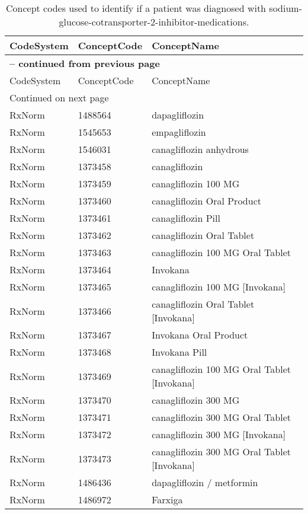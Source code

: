 \begin{longtable}{p{}p{}p{}}
\caption{Concept codes used to identify if a patient was diagnosed with sodium-glucose-cotransporter-2-inhibitor-medications.} \\ 
 CodeSystem & ConceptCode & ConceptName \\ 
  \hline 
\endfirsthead 
\multicolumn{3}{p{\textwidth}}{{ \bfseries \tablename \thetable{} -- continued from previous page}} \\ 
\hline CodeSystem & ConceptCode & ConceptName \\ \hline 
\endhead 
\hline \multicolumn{3}{p{\textwidth}}{{Continued on next page}} \\ \hline 
\endfoot 
\hline 
\endlastfoot 
 \hline
RxNorm & 1488564 & dapagliflozin \\ 
  RxNorm & 1545653 & empagliflozin \\ 
  RxNorm & 1546031 & canagliflozin anhydrous \\ 
  RxNorm & 1373458 & canagliflozin \\ 
  RxNorm & 1373459 & canagliflozin 100 MG \\ 
  RxNorm & 1373460 & canagliflozin Oral Product \\ 
  RxNorm & 1373461 & canagliflozin Pill \\ 
  RxNorm & 1373462 & canagliflozin Oral Tablet \\ 
  RxNorm & 1373463 & canagliflozin 100 MG Oral Tablet \\ 
  RxNorm & 1373464 & Invokana \\ 
  RxNorm & 1373465 & canagliflozin 100 MG [Invokana] \\ 
  RxNorm & 1373466 & canagliflozin Oral Tablet [Invokana] \\ 
  RxNorm & 1373467 & Invokana Oral Product \\ 
  RxNorm & 1373468 & Invokana Pill \\ 
  RxNorm & 1373469 & canagliflozin 100 MG Oral Tablet [Invokana] \\ 
  RxNorm & 1373470 & canagliflozin 300 MG \\ 
  RxNorm & 1373471 & canagliflozin 300 MG Oral Tablet \\ 
  RxNorm & 1373472 & canagliflozin 300 MG [Invokana] \\ 
  RxNorm & 1373473 & canagliflozin 300 MG Oral Tablet [Invokana] \\ 
  RxNorm & 1486436 & dapagliflozin / metformin \\ 
  RxNorm & 1486972 & Farxiga \\ 

\end{longtable}
